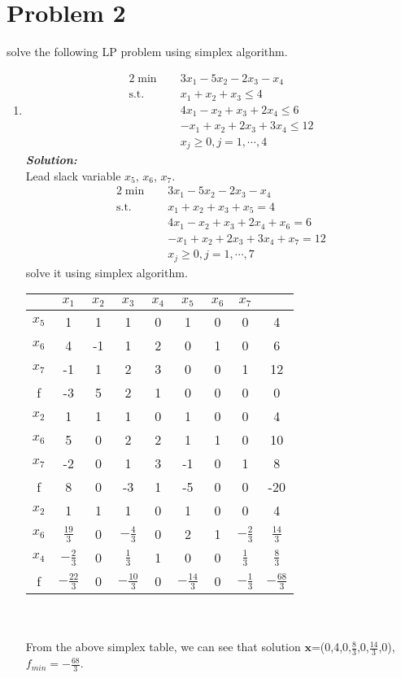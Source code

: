 \documentclass[paper=a4, fontsize=11pt]{scrartcl} %
\numberwithin{equation}{section} %
\numberwithin{figure}{section} %
\numberwithin{table}{section} %
\begin{document}
\section{Problem 2}
solve the following LP problem using simplex algorithm.
\begin{enumerate}
\item
\begin{alignat}{2}          \nonumber
\min\quad & 3x_1-5x_2-2x_3-x_4\\    \nonumber
\mbox{s.t.}\quad            \nonumber
& x_1+x_2+x_3 \leq 4\\        \nonumber
& 4x_1-x_2+x_3+2x_4 \leq 6\\         \nonumber
& -x_1+x_2+2x_3+3x_4 \leq 12\\          \nonumber
& x_j \geq 0, j=1,\cdots,4
\end{alignat}
\emph{\textbf{Solution:}}\\
Lead slack variable $x_5$, $x_6$, $x_7$.
\begin{alignat}{2}          \nonumber
\min\quad & 3x_1-5x_2-2x_3-x_4\\    \nonumber
\mbox{s.t.}\quad            \nonumber
& x_1+x_2+x_3+x_5=4\\        \nonumber
& 4x_1-x_2+x_3+2x_4+x_6 = 6\\         \nonumber
& -x_1+x_2+2x_3+3x_4+x_7 = 12\\          \nonumber
& x_j \geq 0, j=1,\cdots,7
\end{alignat}
solve it using simplex algorithm.\\
\begin{tabular}{|c|c|c|c|c|c|c|c|c|}
\hline &$x_1$&$x_2$&$x_3$&$x_4$&$x_5$&$x_6$&$x_7$&\\
\hline$x_5$&1&1&1&0&1&0&0&4\\
$x_6$&4&-1&1&2&0&1&0&6\\
$x_7$&-1&1&2&3&0&0&1&12\\
\hline f&-3&5&2&1&0&0&0&0\\
\hline
\hline $x_2$&1 & 1& 1& 0& 1& 0& 0&4\\
$x_6$&5 & 0& 2& 2& 1& 1& 0&10\\
$x_7$&-2& 0& 1& 3& -1& 0& 1&8\\
\hline f    &8 & 0&-3& 1& -5& 0& 0&-20\\
\hline
\hline $x_2$&1 & 1& 1& 0& 1& 0& 0&4\\
$x_6$&$\frac{19}{3}$ & 0& $-\frac{4}{3}$& 0& 2& 1&$-\frac{2}{3}$&$\frac{14}{3}$\\
$x_4$&$-\frac{2}{3}$ & 0& $\frac{1}{3}$& 1& 0& 0& $\frac{1}{3}$&$\frac{8}{3}$\\
\hline f    &$-\frac{22}{3}$ & 0&$-\frac{10}{3}$& 0&$-\frac{14}{3}$& 0& $-\frac{1}{3}$&$-\frac{68}{3}$\\
\hline
\end{tabular}
\\\\
From the above simplex table, we can see that solution $\mathbf{x}$=(0,4,0,$\frac{8}{3}$,0,$\frac{14}{3}$,0),$f_{min}=-\frac{68}{3}$.



\end{enumerate}
\end{document}
